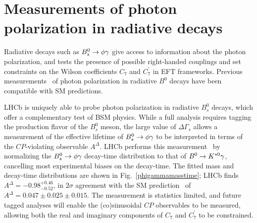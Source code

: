 \section{Measurements of photon polarization in radiative decays}
\label{sec:photpol}
Radiative decays such as ${B}^0_s \rightarrow \phi \gamma$ give access to information
about the photon polarization, and tests the presence of possible right-handed
couplings and set constraints on the Wilson coefficients $C_7$ and $C_7^{\prime}$ in EFT frameworks.
Previous measurements~\cite{HFAG} of photon polarization in radiative $B^0$ decays
have been compatible with SM predictions. 

LHCb is uniquely able to probe photon polarization in radiative $B^0_s$ decays,
which offer a complementary test of BSM physics. While a full analysis requires
tagging the production flavor of the $B^0_s$ meson, the large value of $\Delta\Gamma_s$
allows a measurement of the effective lifetime of ${B}^0_s \rightarrow \phi \gamma$ to be
interpreted in terms of the $CP$-violating observable $A^\Delta$. LHCb
performs this measurement~\cite{LHCb-PAPER-2016-034} by normalizing the ${B}^0_s \rightarrow \phi \gamma$ decay-time distribution
to that of ${B}^0 \rightarrow K^{*0} \gamma$, cancelling most experimental biases on the decay-time.
The fitted mass and decay-time distributions are shown in Fig.~\ref{phigammamasstime}; LHCb finds
$A^\Delta = -0.98^{+0.46}_{-0.52}$, in $2\sigma$ agreement with the SM
prediction~\cite{Muheim:2008vu} of $A^\Delta = 0.047 \pm 0.025 \pm 0.015$. The measurement is statistics
limited, and future tagged analyses will enable the (co)sinusoidal $CP$ observables to
be measured, allowing both the real and imaginary components of $C_7$ and $C_7^{\prime}$ to be constrained.

